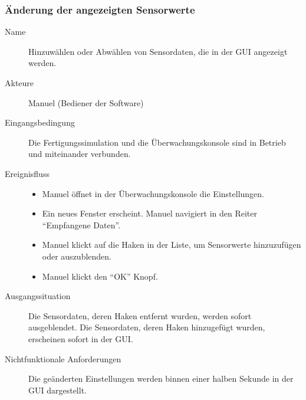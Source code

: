 \documentclass[parskip=full]{scrartcl}
\begin{document}
\subsubsection{Änderung der angezeigten Sensorwerte}
\begin{description}
 \item[Name] Hinzuwählen oder Abwählen von Sensordaten, die in der GUI angezeigt werden.
 \item[Akteure] Manuel (Bediener der Software)
 \item[Eingangsbedingung] Die Fertigungssimulation und die Überwachungskonsole sind in Betrieb und miteinander verbunden.
 \item[Ereignisfluss]
 \begin{itemize}[noitemsep]
  \item Manuel öffnet in der Überwachungskonsole die Einstellungen.
  \item Ein neues Fenster erscheint. Manuel navigiert in den Reiter ``Empfangene Daten''.
  \item Manuel klickt auf die Haken in der Liste, um Sensorwerte hinzuzufügen oder auszublenden.
  \item Manuel klickt den ``OK'' Knopf.
 \end{itemize}
 \item[Ausgangssituation] Die Sensordaten, deren Haken entfernt wurden, werden sofort ausgeblendet. Die Sensordaten, deren Haken hinzugefügt wurden, erscheinen sofort in der GUI.
 \item [Nichtfunktionale Anforderungen] Die geänderten Einstellungen werden binnen einer halben Sekunde in der GUI dargestellt.
\end{description}
\end{document}

